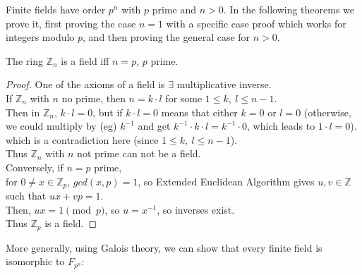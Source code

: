 \documentclass{article}
\theoremstyle{definition}
\newenvironment{thm}[1]
{\renewcommand\theinnerthm{#1}\innerthm}
{\endinnerthm}
\begin{document}
Finite fields have order $p^n$ with $p$ prime and $n > 0$. In the following theorems we prove it, first proving the case $n=1$ with a specific case proof which works for integers modulo $p$, and then proving the general case for $n > 0$.

\begin{thm}{$(\mathbb{Z}_p)$}
  The ring $\mathbb{Z}_n$ is a field iff $n=p$, $p$ prime.
\end{thm}
\begin{proof}
  One of the axioms of a field is $\exists$ multiplicative inverse.\\
  If $\mathbb{Z}_n$ with $n$ no prime, then $n= k \cdot l$ for some $1 \leq k,~l \leq n-1$.\\
  Then in $\mathbb{Z}_n$, $k \cdot l = 0$, but if $k \cdot l=0$ means that either $k=0$ or $l=0$ (otherwise, we could multiply by (eg) $k^{-1}$ and get $k^{-1} \cdot k \cdot l = k^{-1} \cdot 0$, which leads to $1 \cdot l = 0$).\\
  which is a contradiction here (since $1 \leq k,~l \leq n-1$).\\
  Thus $\mathbb{Z}_n$ with $n$ not prime can not be a field.\\
  Conversely, if $n = p$ prime,\\
  for $0 \neq x \in \mathbb{Z}_p$, $gcd(x, p)=1$, so Extended Euclidean Algorithm gives $u, v \in \mathbb{Z}$ such that $u x + v p = 1$.\\
  Then, $ux=1 \pmod p$, so $u=x^{-1}$, so inverses exist.\\
  Thus $\mathbb{Z}_p$ is a field.
\end{proof}

\vspace{0.5cm}
More generally, using Galois theory, we can show that every finite field is isomorphic to $F_{p^n}$:
\end{document}
